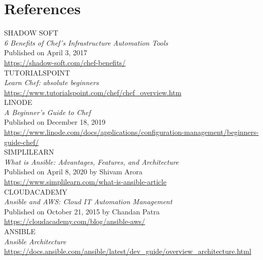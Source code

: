\documentclass[a4paper, 12pt]{article}
\begin{document}
\newpage
\section{References}
SHADOW SOFT\\
\textit{6 Benefits of Chef's Infrastructure Automation Tools}\\
Published on April 3, 2017\\
\href{https://shadow-soft.com/chef-benefits/}{https://shadow-soft.com/chef-benefits/}\\

\noindent
TUTORIALSPOINT\\
\textit{Learn Chef: absolute beginners}\\
\href{https://www.tutorialspoint.com/chef/chef_overview.htm}{https://www.tutorialspoint.com/chef/chef\_overview.htm}\\

\noindent
LINODE\\
\textit{A Beginner's Guide to Chef}\\
Published on December 18, 2019\\
\href{https://www.linode.com/docs/applications/configuration-management/beginners-guide-chef/}{https://www.linode.com/docs/applications/configuration-management/beginners-guide-chef/}\\

\noindent
SIMPLILEARN\\
\textit{What is Ansible: Advantages, Features, and Architecture}\\
Published on April 8, 2020 by Shivam Arora\\
\href{https://www.simplilearn.com/what-is-ansible-article}{https://www.simplilearn.com/what-is-ansible-article}\\

\noindent
CLOUDACADEMY\\
\textit{Ansible and AWS: Cloud IT Automation Management}\\
Published on October 21, 2015 by Chandan Patra\\
\href{https://cloudacademy.com/blog/ansible-aws/}{https://cloudacademy.com/blog/ansible-aws/}\\

\noindent
ANSIBLE\\
\textit{Ansible Architecture}\\
\href{https://docs.ansible.com/ansible/latest/dev_guide/overview_architecture.html}{https://docs.ansible.com/ansible/latest/dev\_guide/overview\_architecture.html}\\
\end{document}
